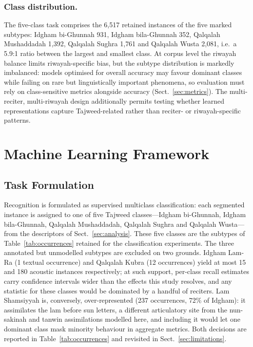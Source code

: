\documentclass[runningheads]{llncs}
\begin{document}
\subsubsection{Class distribution.}
The five-class task comprises the 6{,}517 retained instances of the five marked
subtypes: Idgham bi-Ghunnah 931, Idgham bila-Ghunnah 352, Qalqalah Mushaddadah
1{,}392, Qalqalah Sughra 1{,}761 and Qalqalah Wusta 2{,}081, i.e.\ a 5.9:1
ratio between the largest and smallest class.
At corpus level the riwayah balance limits riwayah-specific bias, but the
subtype distribution is markedly imbalanced: models optimised for overall
accuracy may favour dominant classes while failing on rare but linguistically
important phenomena, so evaluation must rely on class-sensitive metrics
alongside accuracy (Sect.~\ref{sec:metrics}). The multi-reciter, multi-riwayah
design additionally permits testing whether learned representations capture
Tajweed-related rather than reciter- or riwayah-specific patterns.


\section{Machine Learning Framework}
\label{sec:ml}

\subsection{Task Formulation}

Recognition is formulated as supervised multiclass classification: each
segmented instance is assigned to one of five Tajweed classes---Idgham
bi-Ghunnah, Idgham bila-Ghunnah, Qalqalah Mushaddadah, Qalqalah Sughra and
Qalqalah Wusta---from the descriptors of Sect.~\ref{sec:analysis}. These five
classes are the subtypes of Table~\ref{tab:occurrences} retained for the
classification experiments. The three annotated but unmodelled subtypes are
excluded on two grounds. Idgham Lam-Ra (1 textual occurrence) and Qalqalah
Kubra (12 occurrences) yield at most 15 and 180 acoustic instances respectively;
at such support, per-class recall estimates carry confidence intervals wider
than the effects this study resolves, and any statistic for these classes would
be dominated by a handful of reciters. Lam Shamsiyyah is, conversely,
over-represented (237 occurrences, 72\% of Idgham): it assimilates the lam
before sun letters, a different articulatory site from the nun-sakinah and
tanwin assimilations modelled here, and including it would let one dominant
class mask minority behaviour in aggregate metrics. Both decisions are reported
in Table~\ref{tab:occurrences} and revisited in Sect.~\ref{sec:limitations}.
\end{document}
